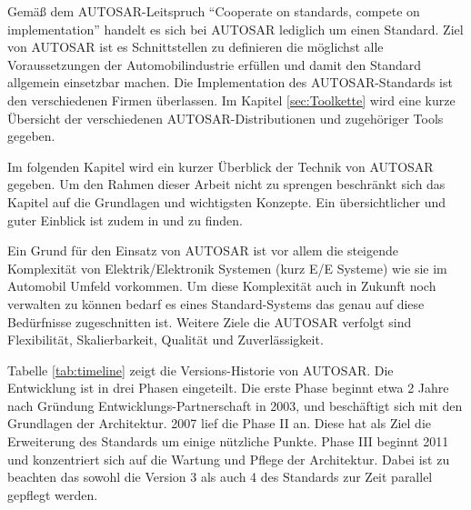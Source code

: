 \documentclass[
  a4paper,					    %
  twoside,
  DIV=calc,     				%
  bibliography=totoc,
  cleardoublepage=empty,
  ngerman,     					%
  final       					%
]{scrbook}
\begin{document}
Gemäß dem AUTOSAR-Leitspruch "`Cooperate on standards, compete on implementation"' handelt es sich bei AUTOSAR lediglich um einen Standard. Ziel von AUTOSAR ist es Schnittstellen zu definieren die möglichst alle Voraussetzungen der Automobilindustrie erfüllen und damit den Standard allgemein einsetzbar machen. Die Implementation des AUTOSAR-Standards ist den verschiedenen Firmen überlassen. Im Kapitel \ref{sec:Toolkette} wird eine kurze Übersicht der verschiedenen AUTOSAR-Distributionen und zugehöriger Tools gegeben.

Im folgenden Kapitel wird ein kurzer Überblick der Technik von AUTOSAR gegeben. Um den Rahmen dieser Arbeit nicht zu sprengen beschränkt sich das Kapitel auf die Grundlagen und wichtigsten Konzepte. Ein übersichtlicher und guter Einblick ist zudem in \cite{autosar_techoverview} und \cite{autosar_layer} zu finden.

Ein Grund für den Einsatz von AUTOSAR ist vor allem die steigende Komplexität von Elektrik/Elektronik Systemen (kurz E/E Systeme) wie sie im Automobil Umfeld vorkommen. Um diese Komplexität auch in Zukunft noch verwalten zu können bedarf es eines Standard-Systems das genau auf diese Bedürfnisse zugeschnitten ist. Weitere Ziele die AUTOSAR verfolgt sind Flexibilität, Skalierbarkeit, Qualität und Zuverlässigkeit.\cite[S. 5]{autosar_techoverview}

Tabelle \ref{tab:timeline} zeigt die Versions-Historie von AUTOSAR. Die Entwicklung ist in drei Phasen eingeteilt. Die erste Phase beginnt etwa 2 Jahre nach Gründung Entwicklungs-Partnerschaft in 2003, und beschäftigt sich mit den Grundlagen der Architektur. 2007 lief die Phase II an. Diese hat als Ziel die Erweiterung des Standards um einige nützliche Punkte. Phase III beginnt 2011 und konzentriert sich auf die Wartung und Pflege der Architektur. Dabei ist zu beachten das sowohl die Version 3 als auch 4 des Standards zur Zeit parallel gepflegt werden.
\end{document}

